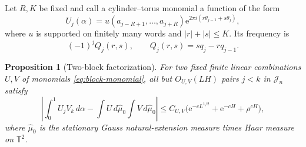 \documentclass[11pt,a4paper]{amsart}
\newtheorem{proposition}[theorem]{Proposition}
\theoremstyle{definition}
\theoremstyle{remark}
\newcommand{\T}{\mathbb T}
\newcommand{\e}{\mathrm e}
\begin{document}
Let $R,K$ be fixed and call a cylinder--torus monomial a function of the form
\begin{equation}\label{eq:block-monomial}
 U_j(\alpha)=u(a_{j-R+1},\ldots,a_{j+R})
 \e^{2\pi i(r\theta_{j-1}+s\theta_j)},
\end{equation}
where $u$ is supported on finitely many words and $|r|+|s|\le K$.  Its
frequency is
\begin{equation}\label{eq:block-frequency}
 (-1)^jQ_j(r,s),\qquad Q_j(r,s)=sq_j-rq_{j-1}.
\end{equation}

\begin{proposition}[Two-block factorization]\label{prop:two-block}
For two fixed finite linear combinations $U,V$ of monomials
\eqref{eq:block-monomial}, all but $O_{U,V}(LH)$ pairs
$j<k$ in $\mathcal J_n$ satisfy
\begin{equation}\label{eq:two-block}
 \left|\int_0^1U_jV_k\,d\alpha
 -\int U\,d\widehat\mu_0\int V\,d\widehat\mu_0\right|
 \le C_{U,V}\bigl(\e^{-cL^{1/2}}+\e^{-cH}+\rho^{cH}\bigr),
\end{equation}
where $\widehat\mu_0$ is the stationary Gauss natural-extension measure
times Haar measure on $\T^2$.
\end{proposition}
\end{document}
